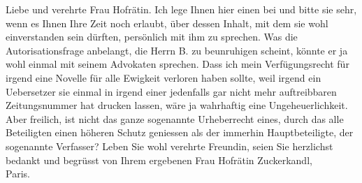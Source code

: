 \pstart{}Liebe und verehrte Frau Hofrätin.\pend\vspace{0.5em}
\pstart
           Ich lege Ihnen hier einen \label{K_L03953-1v}\label{K_L03953-1} bei und bitte sie sehr, wenn es
      Ihnen Ihre Zeit noch erlaubt, über dessen Inhalt,
      mit dem sie wohl einverstanden sein dürften,
      persönlich mit ihm zu sprechen. Was die Autorisationsfrage anbelangt, die Herrn B. zu beunruhigen scheint, könnte er ja wohl einmal mit seinem
      Advokaten sprechen. Dass ich mein Verfügungsrecht für irgend eine Novelle für alle Ewigkeit
      verloren haben sollte, weil irgend ein Uebersetzer sie einmal in irgend einer jedenfalls
      gar nicht mehr auftreibbaren Zeitungsnummer
      hat drucken lassen, wäre ja wahrhaftig eine Ungeheuerlichkeit. Aber freilich, ist nicht das
      ganze sogenannte Urheberrecht eines, durch das
      alle Beteiligten einen höheren Schutz geniessen als der immerhin Hauptbeteiligte, der
      sogenannte Verfasser?\pend
           \pstart Leben Sie wohl verehrte Freundin, seien Sie herzlichst bedankt und begrüsst von Ihrem ergebenen\pend{}{\vspace{1\baselineskip}}
\pstart
           \noindent{}Frau Hofrätin Zuckerkandl,{\\}Paris.\pend
           \endnumbering{}
\begin{anhang}
\end{anhang}\newcommand{\dateiname}{L03953}\newcommand{\titel}{Arthur Schnitzler an Berta Zuckerkandl, 31. 1. 1924}\newcommand{\editorInnen}{Herausgegeben von Jahnke, SelmaMüller, Martin Anton}
